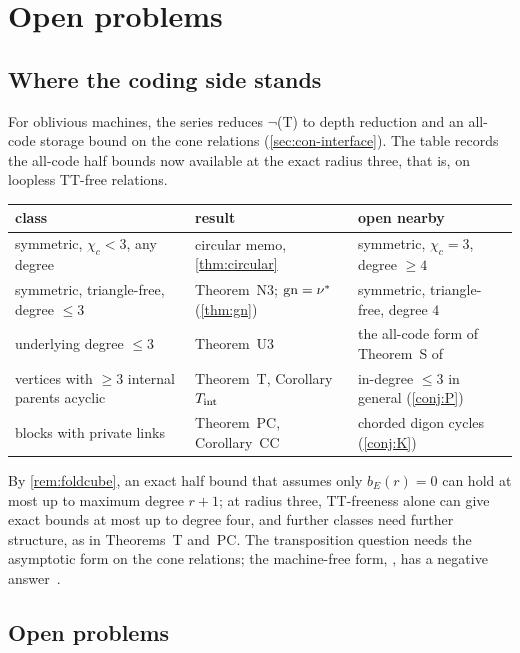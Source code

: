 \section{Open problems}\label{sec:open}

\subsection{Where the coding side stands}

For oblivious machines, the series reduces $\neg$(T) to depth reduction and an all-code storage bound on the cone
relations (\cref{sec:con-interface}). The table records the all-code half bounds now available at the exact radius three,
that is, on loopless TT-free relations.
\begin{center}
\small
\begin{tabular}{@{}>{\raggedright\arraybackslash}p{}>{\raggedright\arraybackslash}p{}>{\raggedright\arraybackslash}p{}@{}}
\toprule
\textbf{class} & \textbf{result} & \textbf{open nearby} \\
\midrule
symmetric, $\chi_c<3$, any degree & circular memo, \cref{thm:circular} & symmetric, $\chi_c=3$, degree $\ge4$ \\
\addlinespace
symmetric, triangle-free, degree $\le3$ & Theorem~N3; $\mathrm{gn}=\nu^{*}$ (\cref{thm:gn}) & symmetric, triangle-free, degree $4$ \\
\addlinespace
underlying degree $\le3$ & Theorem~U3 & the all-code form of Theorem~S of~\cite{FourthPaper2026} \\
\addlinespace
vertices with $\ge3$ internal parents acyclic & Theorem~T, Corollary~$T_{\mathrm{int}}$ & in-degree $\le3$ in general (\cref{conj:P}) \\
\addlinespace
blocks with private links & Theorem~PC, Corollary~CC & chorded digon cycles (\cref{conj:K}) \\
\bottomrule
\end{tabular}
\end{center}
By \cref{rem:foldcube}, an exact half bound that assumes only $b_E(r)=0$ can hold at most up to maximum degree $r+1$;
at radius three, TT-freeness alone can give exact bounds at most up to degree four, and further classes need further
structure, as in Theorems~T and~PC. The transposition question needs the asymptotic form on the cone relations; the
machine-free form, \cite[Question~9.1]{DirectedRecovery2026}, has a negative answer~\cite[Theorem~A]{StorageCodes2026}.

\subsection{Open problems}

